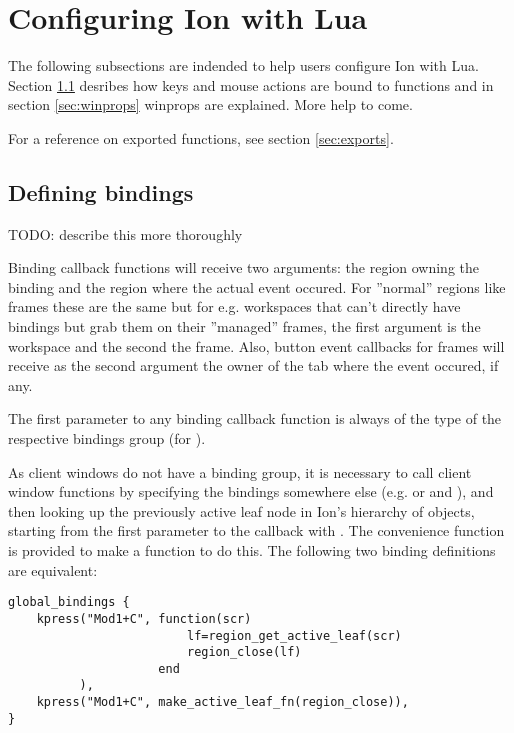 
\section{Configuring Ion with Lua}

The following subsections are indended to help users configure Ion
with Lua. Section \ref{sec:bindings} desribes how keys and mouse
actions are bound to functions and in section \ref{sec:winprops}
winprops are explained. More help to come.

For a reference on exported functions, see section \ref{sec:exports}.

\subsection{Defining bindings}
\label{sec:bindings}

TODO: describe this more thoroughly

Binding callback functions will receive two arguments: the region
owning the binding and the region where the actual event occured.
For ''normal'' regions like frames these are the same but for e.g.
workspaces that can't directly have bindings but grab them on their
''managed'' frames, the first argument is the workspace and the second
the frame. Also, button event callbacks for frames will receive as the
second argument the owner of the tab where the event occured, if any.

The first parameter to any binding callback function is always of the
type of the respective bindings group (for 
).

As client windows do not have a binding group, it is necessary to
call client window functions by specifying the bindings somewhere
else (e.g.  or 
and ), and then looking up the previously
active leaf node in Ion's hierarchy of objects, starting from the
first parameter to the callback with
%
.
The convenience function  is provided to
make a function to do this. The following two binding definitions are
equivalent:

\begin{verbatim}
global_bindings {
    kpress("Mod1+C", function(scr)
                         lf=region_get_active_leaf(scr)
                         region_close(lf)
                     end
          ),
    kpress("Mod1+C", make_active_leaf_fn(region_close)),
}
\end{verbatim}

